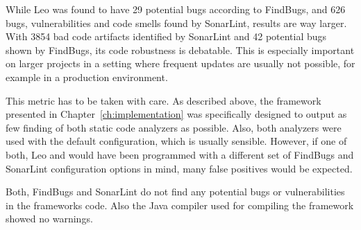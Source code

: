 While Leo was found to have 29 potential bugs according to FindBugs, and 626 bugs, vulnerabilities and code smells found by SonarLint, \uimaas{} results are way larger. With 3854 bad code artifacts identified by SonarLint and 42 potential bugs shown by FindBugs, its code robustness is debatable. This is especially important on larger projects in a setting where frequent updates are usually not possible, for example in a production environment.

This metric has to be taken with care. As described above, the framework presented in Chapter~\ref{ch:implementation} was specifically designed to output as few finding of both static code analyzers as possible. Also, both analyzers were used with the default configuration, which is usually sensible. However, if one of both, Leo and \uimaas{} would have been programmed with a different set of FindBugs and SonarLint configuration options in mind, many false positives would be expected.

Both, FindBugs and SonarLint do not find any potential bugs or vulnerabilities in the frameworks code. Also the Java compiler used for compiling the framework showed no warnings.

